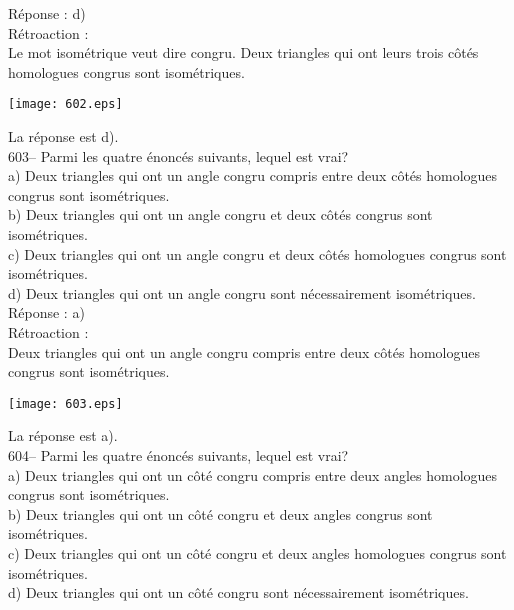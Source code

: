 ﻿\documentclass[letterpaper, 12pt]{article}
\begin{document}
R\'eponse : d)\\

R\'etroaction : \\
Le mot isom\'etrique veut dire congru.  Deux triangles qui ont leurs
trois c\^ot\'es homologues congrus sont isom\'etriques.
\begin{center}
    \texttt{[image: 602.eps]}
    \end{center} La r\'eponse est d).\\

603-- Parmi les quatre \'enonc\'es suivants, lequel est vrai?\\
a) Deux triangles qui ont un angle congru compris entre deux c\^ot\'es
homologues congrus sont isom\'etriques. \\
b) Deux triangles qui ont un angle congru et deux c\^ot\'es congrus sont
isom\'etriques.\\
c) Deux triangles qui ont un angle congru et deux c\^ot\'es homologues
congrus sont isom\'etriques.\\
d) Deux triangles qui ont un angle congru sont n\'ecessairement
isom\'etriques.\\

R\'eponse : a)\\

R\'etroaction : \\
Deux triangles qui ont un angle congru compris entre deux c\^ot\'es
homologues congrus sont isom\'etriques.   \begin{center}
    \texttt{[image: 603.eps]}
    \end{center}  La r\'eponse est a).\\

604-- Parmi les quatre \'enonc\'es suivants, lequel est vrai?\\
a) Deux triangles qui ont un c\^ot\'e congru compris entre deux angles
homologues congrus sont isom\'etriques.\\
b) Deux triangles qui ont un c\^ot\'e congru et deux angles congrus sont
isom\'etriques.\\
c) Deux triangles qui ont un c\^ot\'e congru et deux angles homologues
congrus sont isom\'etriques.\\
d) Deux triangles qui ont un c\^ot\'e congru sont n\'ecessairement
isom\'etriques.\\
\end{document}
